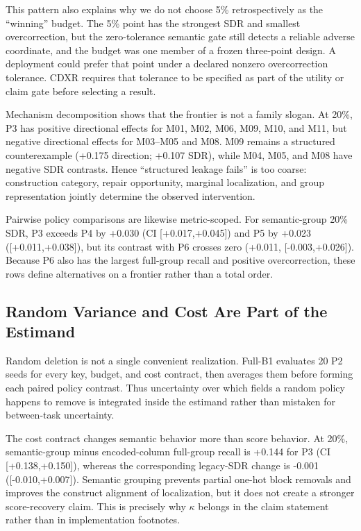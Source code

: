 \documentclass[sigconf,review]{acmart}
\begin{document}
This pattern also explains why we do not choose 5\% retrospectively as the
``winning'' budget. The 5\% point has the strongest SDR and smallest
overcorrection, but the zero-tolerance semantic gate still detects a reliable
adverse coordinate, and the budget was one member of a frozen three-point
design. A deployment could prefer that point under a declared nonzero
overcorrection tolerance. CDXR requires that tolerance to be specified as part
of the utility or claim gate before selecting a result.

Mechanism decomposition shows that the frontier is not a family slogan. At
20\%, P3 has positive directional effects for M01, M02, M06, M09, M10, and
M11, but negative directional effects for M03--M05 and M08. M09 remains a
structured counterexample (+0.175 direction; +0.107 SDR), while M04, M05, and
M08 have negative SDR contrasts. Hence ``structured leakage fails'' is too
coarse: construction category, repair opportunity, marginal localization, and
group representation jointly determine the observed intervention.

Pairwise policy comparisons are likewise metric-scoped. For semantic-group
20\% SDR, P3 exceeds P4 by +0.030 (CI [+0.017,+0.045]) and P5 by +0.023
([+0.011,+0.038]), but its contrast with P6 crosses zero (+0.011,
[-0.003,+0.026]). Because P6 also has the largest full-group recall and positive
overcorrection, these rows define alternatives on a frontier rather than a
total order.

\subsection{Random Variance and Cost Are Part of the Estimand}

Random deletion is not a single convenient realization. Full-B1 evaluates 20
P2 seeds for every key, budget, and cost contract, then averages them before
forming each paired policy contrast. Thus uncertainty over which fields a
random policy happens to remove is integrated inside the estimand rather than
mistaken for between-task uncertainty.

The cost contract changes semantic behavior more than score behavior. At 20\%,
semantic-group minus encoded-column full-group recall is +0.144 for P3
(CI [+0.138,+0.150]), whereas the corresponding legacy-SDR change is -0.001
([-0.010,+0.007]). Semantic grouping prevents partial one-hot block removals
and improves the construct alignment of localization, but it does not create a
stronger score-recovery claim. This is precisely why $\kappa$ belongs in the
claim statement rather than in implementation footnotes.
\end{document}
